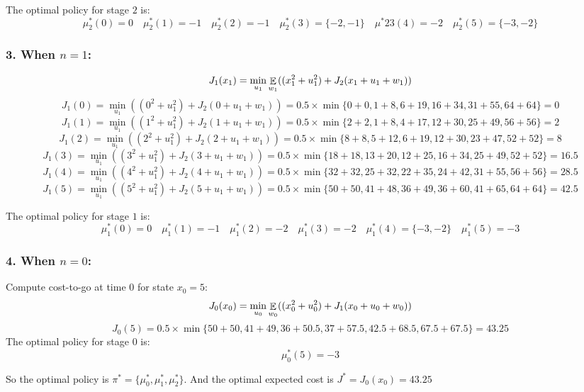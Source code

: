 The optimal policy for stage \( 2 \) is:
\[ \mu^*_2(0)=0 \quad \mu^*_2(1)=-1 \quad \mu^*_2(2)=-1 \quad \mu^*_2(3)=\{ -2, -1 \} \quad \mu^*23(4)=-2 \quad \mu^*_2(5)=\{ -3, -2 \} \]

\subsubsection*{3. When \( n = 1 \):}
\[ J_1(x_1) = \min_{u_1} \mathop{\mathbb{E}}_{w_1} ((x_1^2 + u_1^2) + J_2(x_1 + u_1 + w_1)) \]
\[
    J_1(0) = \min_{u_1} ((0^2 + u_1^2) + J_2(0 + u_1 + w_1))
    = 0.5 \times \min \{ 0+0, 1+8, 6+19, 16+34, 31+55, 64+64 \}
    = 0
\]
\[
    J_1(1) = \min_{u_1} ((1^2 + u_1^2) + J_2(1 + u_1 + w_1))
    = 0.5 \times \min \{ 2+2, 1+8, 4+17, 12+30, 25+49, 56+56 \}
    = 2
\]
\[
    J_1(2) = \min_{u_1} ((2^2 + u_1^2) + J_2(2 + u_1 + w_1))
    = 0.5 \times \min \{ 8+8, 5+12, 6+19, 12+30, 23+47, 52+52 \}
    = 8
\]
\[
    J_1(3) = \min_{u_1} ((3^2 + u_1^2) + J_2(3 + u_1 + w_1))
    = 0.5 \times \min \{ 18+18, 13+20, 12+25, 16+34, 25+49, 52+52 \}
    = 16.5
\]
\[
    J_1(4) = \min_{u_1} ((4^2 + u_1^2) + J_2(4 + u_1 + w_1))
    = 0.5 \times \min \{ 32+32, 25+32, 22+35, 24+42, 31+55, 56+56 \}
    = 28.5
\]
\[
    J_1(5) = \min_{u_1} ((5^2 + u_1^2) + J_2(5 + u_1 + w_1))
    = 0.5 \times \min \{ 50+50, 41+48, 36+49, 36+60, 41+65, 64+64 \}
    = 42.5
\]

The optimal policy for stage \( 1 \) is:
\[
    \mu^*_1(0)=0 \quad
    \mu^*_1(1)=-1 \quad
    \mu^*_1(2)=-2 \quad
    \mu^*_1(3)=-2 \quad
    \mu^*_1(4)=\{ -3, -2 \} \quad
    \mu^*_1(5)=-3
\]

\subsubsection*{4. When \( n = 0 \):}
Compute cost-to-go at time \( 0 \) for state \( x_0 = 5 \):
\[ J_0(x_0) = \min_{u_0} \mathop{\mathbb{E}}_{w_0} ((x_0^2 + u_0^2) + J_1(x_0 + u_0 + w_0)) \]
\[
    J_0(5)
    = 0.5 \times \min \{ 50+50, 41+49, 36+50.5, 37+57.5, 42.5+68.5, 67.5+67.5 \}
    = 43.25
\]
The optimal policy for stage \( 0 \) is:
\[
    \mu^*_0(5)=-3
\]

So the optimal policy is \( \pi^* = \{ \mu_0^*, \mu_1^*, \mu_2^* \} \).
And the optimal expected cost is \( J^* = J_0(x_0) = 43.25 \)
